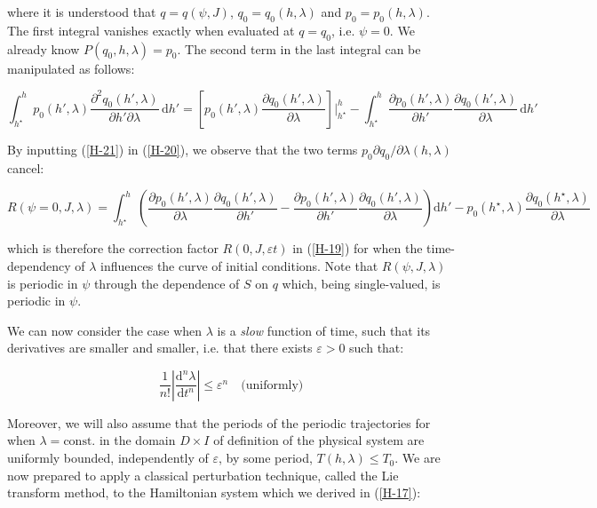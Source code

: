 where it is understood that $q=q(\psi,J)$, $q_0=q_0(h,\lambda)$ and $p_0=p_0(h,\lambda)$. The first integral vanishes exactly when evaluated at $q=q_0$, i.e. $\psi=0$. We already know $P(q_0,h,\lambda)=p_0$. The second term in the last integral can be manipulated as follows:

\begin{equation}
    \label{H-21}
    \int_{h^\star}^h p_0(h',\lambda)\frac{\partial^2q_0(h',\lambda)}{\partial h'\partial\lambda}\,\mathrm{d}h'=\left[p_0(h',\lambda)\frac{\partial q_0(h',\lambda)}{\partial \lambda}\right]\biggr|_{h^\star}^h-\int_{h^\star}^h \frac{\partial p_0(h',\lambda)}{\partial h'}\frac{\partial q_0(h',\lambda)}{\partial \lambda}\,\mathrm{d}h'
\end{equation}

By inputting (\ref{H-21}) in (\ref{H-20}), we observe that the two terms $p_0\partial q_0/\partial\lambda(h,\lambda)$ cancel:

\begin{equation}
    R(\psi=0,J,\lambda)=\int_{h^\star}^h \left(\frac{\partial p_0(h',\lambda)}{\partial \lambda}\frac{\partial q_0(h',\lambda)}{\partial h'}-\frac{\partial p_0(h',\lambda)}{\partial h'}\frac{\partial q_0(h',\lambda)}{\partial \lambda}\right)\mathrm{d}h'-p_0(h^\star,\lambda)\frac{\partial q_0(h^\star,\lambda)}{\partial \lambda}
\end{equation}

which is therefore the correction factor $R(0,J,\varepsilon t)$ in (\ref{H-19}) for when the time-dependency of $\lambda$ influences the curve of initial conditions. Note that $R(\psi, J, \lambda)$ is periodic in $\psi$ through the dependence of $S$ on $q$ which, being single-valued, is periodic in $\psi$.

\vspace*{2.5pt}

\quad We can now consider the case when $\lambda$ is a \textit{slow} function of time, such that its derivatives are smaller and smaller, i.e. that there exists $\varepsilon>0$ such that:

\begin{equation*}
    \frac{1}{n!}\left|\frac{\mathrm{d}^n\lambda}{\mathrm{d}t^n}\right|\leq \varepsilon^n\quad\text{(uniformly)}
\end{equation*}

Moreover, we will also assume that the periods of the periodic trajectories for when $\lambda=\text{const.}$ in the domain $D\times I$ of definition of the physical system are uniformly bounded, independently of $\varepsilon$, by some period, $T(h,\lambda)\leq T_0$. We are now prepared to apply a classical perturbation technique, called the Lie transform method, to the Hamiltonian system which we derived in (\ref{H-17}):

